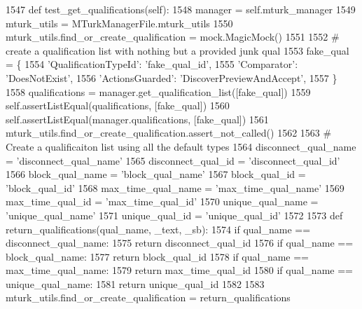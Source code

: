 \begin{DoxyCode}
1547     \textcolor{keyword}{def }test\_get\_qualifications(self):
1548         manager = self.mturk\_manager
1549         mturk\_utils = MTurkManagerFile.mturk\_utils
1550         mturk\_utils.find\_or\_create\_qualification = mock.MagicMock()
1551 
1552         \textcolor{comment}{# create a qualification list with nothing but a provided junk qual}
1553         fake\_qual = \{
1554             \textcolor{stringliteral}{'QualificationTypeId'}: \textcolor{stringliteral}{'fake\_qual\_id'},
1555             \textcolor{stringliteral}{'Comparator'}: \textcolor{stringliteral}{'DoesNotExist'},
1556             \textcolor{stringliteral}{'ActionsGuarded'}: \textcolor{stringliteral}{'DiscoverPreviewAndAccept'},
1557         \}
1558         qualifications = manager.get\_qualification\_list([fake\_qual])
1559         self.assertListEqual(qualifications, [fake\_qual])
1560         self.assertListEqual(manager.qualifications, [fake\_qual])
1561         mturk\_utils.find\_or\_create\_qualification.assert\_not\_called()
1562 
1563         \textcolor{comment}{# Create a qualificaiton list using all the default types}
1564         disconnect\_qual\_name = \textcolor{stringliteral}{'disconnect\_qual\_name'}
1565         disconnect\_qual\_id = \textcolor{stringliteral}{'disconnect\_qual\_id'}
1566         block\_qual\_name = \textcolor{stringliteral}{'block\_qual\_name'}
1567         block\_qual\_id = \textcolor{stringliteral}{'block\_qual\_id'}
1568         max\_time\_qual\_name = \textcolor{stringliteral}{'max\_time\_qual\_name'}
1569         max\_time\_qual\_id = \textcolor{stringliteral}{'max\_time\_qual\_id'}
1570         unique\_qual\_name = \textcolor{stringliteral}{'unique\_qual\_name'}
1571         unique\_qual\_id = \textcolor{stringliteral}{'unique\_qual\_id'}
1572 
1573         \textcolor{keyword}{def }return\_qualifications(qual\_name, \_text, \_sb):
1574             \textcolor{keywordflow}{if} qual\_name == disconnect\_qual\_name:
1575                 \textcolor{keywordflow}{return} disconnect\_qual\_id
1576             \textcolor{keywordflow}{if} qual\_name == block\_qual\_name:
1577                 \textcolor{keywordflow}{return} block\_qual\_id
1578             \textcolor{keywordflow}{if} qual\_name == max\_time\_qual\_name:
1579                 \textcolor{keywordflow}{return} max\_time\_qual\_id
1580             \textcolor{keywordflow}{if} qual\_name == unique\_qual\_name:
1581                 \textcolor{keywordflow}{return} unique\_qual\_id
1582 
1583         mturk\_utils.find\_or\_create\_qualification = return\_qualifications

\end{DoxyCode}
